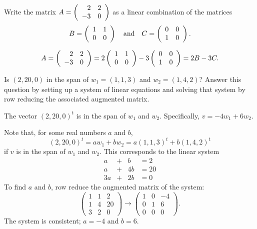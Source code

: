\documentclass{ximera}
\begin{document}
\begin{exercise} \label{c5.2.4}
Write the matrix $A=\left(\begin{array}{rr} 2 & 2\\ -3 &0\end{array}\right)$ as a linear combination
of the matrices
\[
B=\left(\begin{array}{rr} 1 & 1\\ 0 &0\end{array}\right) \quad\mbox{and}\quad C=\left(\begin{array}{rr} 0 & 0\\ 1 &0\end{array}\right).
\]

\begin{solution}

\[ A = \left(\begin{array}{rr} 2 & 2\\ -3 &0\end{array}\right) = 2\left(\begin{array}{rr} 1 & 1\\ 0 &0\end{array}\right) -
3\left(\begin{array}{rr} 0 & 0\\ 1 &0\end{array}\right) = 2B - 3C. \]

\end{solution}
\end{exercise}

\begin{exercise} \label{c5.2.5}
Is $(2,20,0)$ in the span of $w_1=(1,1,3)$ and $w_2=(1,4,2)$?
Answer this question by setting up a system of linear equations
and solving that system by row reducing the associated augmented
matrix.

\begin{solution}

\ans The vector $(2,20,0)^t$ is in the span of $w_1$ and $w_2$. 
Specifically, $v = -4w_1 + 6w_2$.

\soln Note that, for some real numbers $a$ and $b$,
\[
(2,20,0)^t = aw_1 + bw_2 = a(1,1,3)^t + b(1,4,2)^t
\]
if $v$ is in the span of $w_1$ and $w_2$.
This corresponds to the linear system
\[
\begin{array}{rrrrr}
a & + & b & = 2 \\
a & + & 4b & = 20 \\
3a & + & 2b & = 0 \end{array}
\]
To find $a$ and $b$, row reduce the augmented matrix of the system:
\[
\left(\begin{array}{rr|r} 1 & 1 & 2 \\ 1 & 4 & 20 \\
3 & 2 & 0 \end{array}\right) \longrightarrow
\left(\begin{array}{rr|r} 1 & 0 & -4 \\ 0 & 1 & 6 \\
0 & 0 & 0 \end{array}\right).
\]
The system is consistent; $a = -4$ and $b = 6$.

\end{solution}
\end{exercise}
\end{document}
